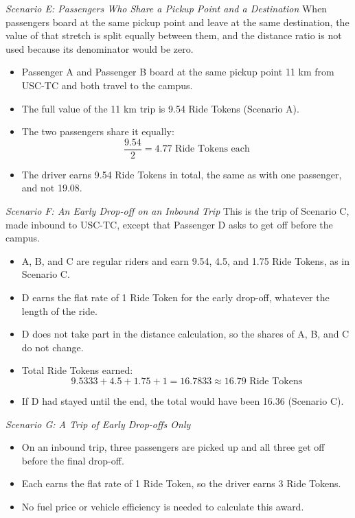 \vspace{1em}
\noindent\textit{Scenario E: Passengers Who Share a Pickup Point and a Destination}
When passengers board at the same pickup point and leave at the same destination, the value of that stretch is split equally between them, and the distance ratio is not used because its denominator would be zero.
\begin{itemize}
    \item Passenger A and Passenger B board at the same pickup point 11 km from USC-TC and both travel to the campus.
    \item The full value of the 11 km trip is 9.54 Ride Tokens (Scenario A).
    \item The two passengers share it equally:
    \[
    \frac{9.54}{2} = 4.77 \text{ Ride Tokens each}
    \]
    \item The driver earns 9.54 Ride Tokens in total, the same as with one passenger, and not 19.08.
\end{itemize}

\vspace{1em}
\noindent\textit{Scenario F: An Early Drop-off on an Inbound Trip}
This is the trip of Scenario C, made inbound to USC-TC, except that Passenger D asks to get off before the campus.
\begin{itemize}
    \item A, B, and C are regular riders and earn 9.54, 4.5, and 1.75 Ride Tokens, as in Scenario C.
    \item D earns the flat rate of 1 Ride Token for the early drop-off, whatever the length of the ride.
    \item D does not take part in the distance calculation, so the shares of A, B, and C do not change.
    \item Total Ride Tokens earned:
    \[
    9.5333 + 4.5 + 1.75 + 1 = 16.7833 \approx 16.79 \text{ Ride Tokens}
    \]
    \item If D had stayed until the end, the total would have been 16.36 (Scenario C).
\end{itemize}

\vspace{1em}
\noindent\textit{Scenario G: A Trip of Early Drop-offs Only}
\begin{itemize}
    \item On an inbound trip, three passengers are picked up and all three get off before the final drop-off.
    \item Each earns the flat rate of 1 Ride Token, so the driver earns 3 Ride Tokens.
    \item No fuel price or vehicle efficiency is needed to calculate this award.
\end{itemize}

